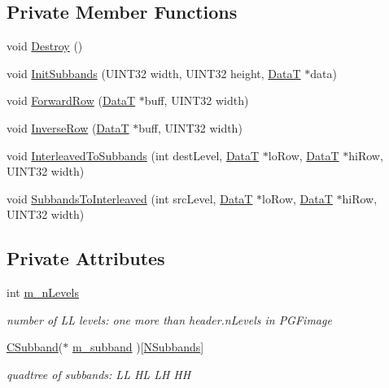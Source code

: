 \subsection*{Private Member Functions}
\begin{DoxyCompactItemize}
\item 
void \mbox{\hyperlink{classCWaveletTransform_a72c1bc79111534886187fcf2ac4cebea}{Destroy}} ()
\item 
void \mbox{\hyperlink{classCWaveletTransform_a4d03868a4bb8688235d41d6b1d7a97de}{Init\+Subbands}} (U\+I\+N\+T32 width, U\+I\+N\+T32 height, \mbox{\hyperlink{PGFtypes_8h_acb1ee3f52ccfad782dcaa0abd79e5d05}{DataT}} $\ast$data)
\item 
void \mbox{\hyperlink{classCWaveletTransform_a7c82d85117e367c8302b2e4681db138d}{Forward\+Row}} (\mbox{\hyperlink{PGFtypes_8h_acb1ee3f52ccfad782dcaa0abd79e5d05}{DataT}} $\ast$buff, U\+I\+N\+T32 width)
\item 
void \mbox{\hyperlink{classCWaveletTransform_a1a39a469fd695c50efc42d744689982d}{Inverse\+Row}} (\mbox{\hyperlink{PGFtypes_8h_acb1ee3f52ccfad782dcaa0abd79e5d05}{DataT}} $\ast$buff, U\+I\+N\+T32 width)
\item 
void \mbox{\hyperlink{classCWaveletTransform_a7e926fe30c00e2bfa23f00a28a393f43}{Interleaved\+To\+Subbands}} (int dest\+Level, \mbox{\hyperlink{PGFtypes_8h_acb1ee3f52ccfad782dcaa0abd79e5d05}{DataT}} $\ast$lo\+Row, \mbox{\hyperlink{PGFtypes_8h_acb1ee3f52ccfad782dcaa0abd79e5d05}{DataT}} $\ast$hi\+Row, U\+I\+N\+T32 width)
\item 
void \mbox{\hyperlink{classCWaveletTransform_a415837709c90ed360a8415a6463a3e29}{Subbands\+To\+Interleaved}} (int src\+Level, \mbox{\hyperlink{PGFtypes_8h_acb1ee3f52ccfad782dcaa0abd79e5d05}{DataT}} $\ast$lo\+Row, \mbox{\hyperlink{PGFtypes_8h_acb1ee3f52ccfad782dcaa0abd79e5d05}{DataT}} $\ast$hi\+Row, U\+I\+N\+T32 width)
\end{DoxyCompactItemize}
\subsection*{Private Attributes}
\begin{DoxyCompactItemize}
\item 
int \mbox{\hyperlink{classCWaveletTransform_ad8c2d96ff3e7125da10de8785631460a}{m\+\_\+n\+Levels}}
\begin{DoxyCompactList}\small\item\em number of LL levels\+: one more than header.\+n\+Levels in P\+G\+Fimage \end{DoxyCompactList}\item 
\mbox{\hyperlink{classCSubband}{C\+Subband}}($\ast$ \mbox{\hyperlink{classCWaveletTransform_a0116d5d57b09e2c9f19776531dbc20f7}{m\+\_\+subband}} )\mbox{[}\mbox{\hyperlink{PGFtypes_8h_a0cf7b93e79e7ebfc148bc9dff30d8cd1}{N\+Subbands}}\mbox{]}
\begin{DoxyCompactList}\small\item\em quadtree of subbands\+: LL HL LH HH \end{DoxyCompactList}\end{DoxyCompactItemize}
